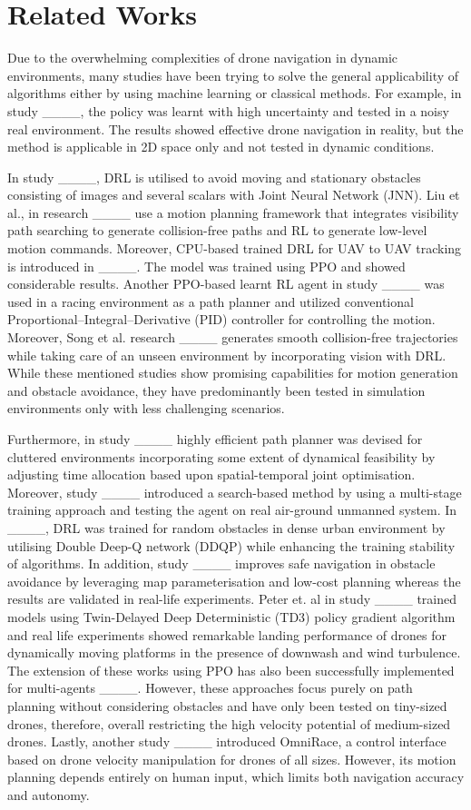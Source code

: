 \section{Related Works}
Due to the overwhelming complexities of drone navigation in dynamic environments, many studies have been trying to solve the general applicability of algorithms either by using machine learning or classical methods. For example, in study ____, the policy was learnt with high uncertainty and tested in a noisy real environment. The results showed effective drone navigation in reality, but the method is applicable in 2D space only and not tested in dynamic conditions. 

In study ____, DRL is utilised to avoid moving and stationary obstacles consisting of images and several scalars with Joint Neural Network (JNN). Liu et al., in research ____ use a motion planning framework that integrates visibility path searching to generate collision-free paths and RL to generate low-level motion commands. Moreover, CPU-based trained DRL for UAV to UAV tracking is introduced in ____. The model was trained using PPO and showed considerable results. Another PPO-based learnt RL agent in study ____ was used in a racing environment as a path planner and utilized conventional Proportional–Integral–Derivative (PID) controller for controlling the motion. Moreover, Song et al. research ____ generates smooth collision-free trajectories while taking care of an unseen environment by incorporating vision with DRL. While these mentioned studies show promising capabilities for motion generation and obstacle avoidance, they have predominantly been tested in simulation environments only with less challenging scenarios.

Furthermore, in study ____ highly efficient path planner was devised for cluttered environments incorporating some extent of dynamical feasibility by adjusting time allocation based upon spatial-temporal joint optimisation. Moreover, study ____ introduced a search-based method by using a multi-stage training approach and testing the agent on real air-ground unmanned system. In ____, DRL was trained for random obstacles in dense urban environment by utilising Double Deep-Q network (DDQP) while enhancing the training stability of algorithms. In addition, study ____ improves safe navigation in obstacle avoidance by leveraging map parameterisation and low-cost planning whereas the results are validated in real-life experiments. Peter et. al in study ____ trained models using Twin-Delayed Deep Deterministic (TD3) policy gradient algorithm and real life experiments showed remarkable landing performance of drones for dynamically moving platforms in the presence of downwash and wind turbulence. The extension of these works using PPO has also been successfully implemented for multi-agents ____. However, these approaches focus purely on path planning without considering obstacles and have only been tested on tiny-sized drones, therefore, overall restricting the high velocity potential of medium-sized drones. Lastly, another study ____ introduced OmniRace, a control interface based on drone velocity manipulation for drones of all sizes. However, its motion planning depends entirely on human input, which limits both navigation accuracy and autonomy.

